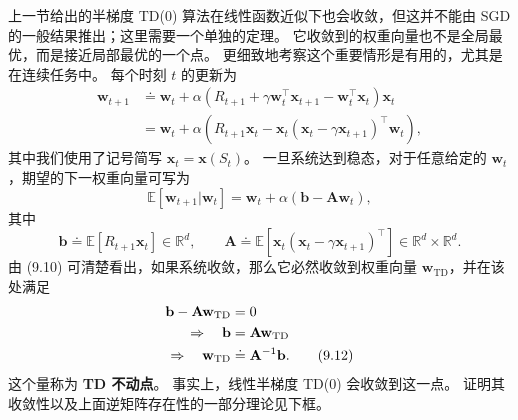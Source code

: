\documentclass[UTF8,12pt,a4paper,fontset=fandol]{ctexart}
\begin{document}
上一节给出的半梯度 TD(0) 算法在线性函数近似下也会收敛，但这并不能由 SGD 的一般结果推出；这里需要一个单独的定理。
它收敛到的权重向量也不是全局最优，而是接近局部最优的一个点。
更细致地考察这个重要情形是有用的，尤其是在连续任务中。
每个时刻 $t$ 的更新为
\begin{align}
\mathbf{w}_{t+1}
&\doteq \mathbf{w}_t+\alpha\left(R_{t+1}+\gamma\mathbf{w}_t^\top\mathbf{x}_{t+1}-\mathbf{w}_t^\top\mathbf{x}_t\right)\mathbf{x}_t \tag{9.9}\\
&= \mathbf{w}_t+\alpha\left(R_{t+1}\mathbf{x}_t-\mathbf{x}_t(\mathbf{x}_t-\gamma\mathbf{x}_{t+1})^\top\mathbf{w}_t\right),
\end{align}
其中我们使用了记号简写 $\mathbf{x}_t=\mathbf{x}(S_t)$。
一旦系统达到稳态，对于任意给定的 $\mathbf{w}_t$，期望的下一权重向量可写为
\begin{equation}
\mathbb{E}[\mathbf{w}_{t+1}|\mathbf{w}_t]
=\mathbf{w}_t+\alpha(\mathbf{b}-\mathbf{A}\mathbf{w}_t),
\tag{9.10}
\end{equation}
其中
\begin{equation}
\mathbf{b}\doteq \mathbb{E}[R_{t+1}\mathbf{x}_t]\in\mathbb{R}^d,
\qquad
\mathbf{A}\doteq \mathbb{E}\!\left[\mathbf{x}_t(\mathbf{x}_t-\gamma\mathbf{x}_{t+1})^\top\right]\in\mathbb{R}^d\times\mathbb{R}^d.
\tag{9.11}
\end{equation}
由 (9.10) 可清楚看出，如果系统收敛，那么它必然收敛到权重向量 $\mathbf{w}_{\mathrm{TD}}$，并在该处满足
\begin{align}
\mathbf{b}-\mathbf{A}\mathbf{w}_{\mathrm{TD}}&=0 \notag\\
\Rightarrow\quad \mathbf{b}&=\mathbf{A}\mathbf{w}_{\mathrm{TD}} \notag\\
\Rightarrow\quad \mathbf{w}_{\mathrm{TD}}&\doteq \mathbf{A}^{-1}\mathbf{b}.
\tag{9.12}
\end{align}
这个量称为 \textbf{TD 不动点}。
事实上，线性半梯度 TD(0) 会收敛到这一点。
证明其收敛性以及上面逆矩阵存在性的一部分理论见下框。
\end{document}
